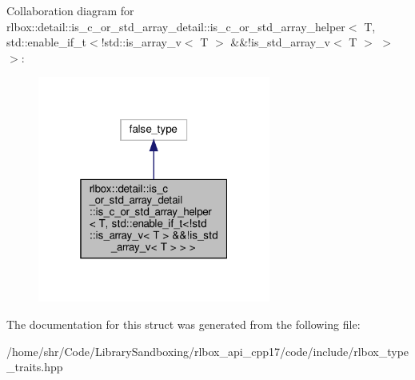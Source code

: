 Collaboration diagram for rlbox\+:\+:detail\+:\+:is\+\_\+c\+\_\+or\+\_\+std\+\_\+array\+\_\+detail\+:\+:is\+\_\+c\+\_\+or\+\_\+std\+\_\+array\+\_\+helper$<$ T, std\+:\+:enable\+\_\+if\+\_\+t$<$!std\+:\+:is\+\_\+array\+\_\+v$<$ T $>$ \&\&!is\+\_\+std\+\_\+array\+\_\+v$<$ T $>$ $>$ $>$\+:
\nopagebreak
\begin{figure}[H]
\begin{center}
\leavevmode
\includegraphics[width=217pt]{structrlbox_1_1detail_1_1is__c__or__std__array__detail_1_1is__c__or__std__array__helper_3_01T_00288e3a130f4a589742c8547d36cafb67}
\end{center}
\end{figure}


The documentation for this struct was generated from the following file\+:\begin{DoxyCompactItemize}
\item 
/home/shr/\+Code/\+Library\+Sandboxing/rlbox\+\_\+api\+\_\+cpp17/code/include/rlbox\+\_\+type\+\_\+traits.\+hpp\end{DoxyCompactItemize}

